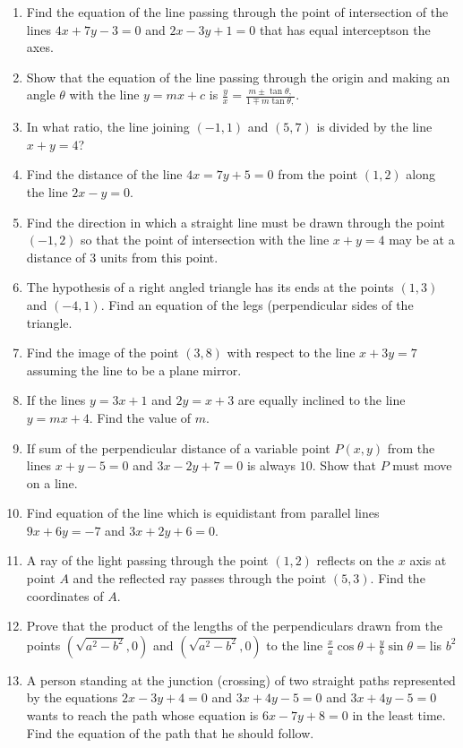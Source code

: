 \documentclass{article}
\theoremstyle{remark}
\begin{document}
\begin{enumerate}
\item Find the equation of the line passing through the point of intersection of the lines $4x+7y-3=0$ and $2x-3y+1=0$ that has equal interceptson the axes.
\item Show that the equation of the line passing through the origin and making an angle $\theta$ with the line $y=mx+c$ is $\frac{y}{x}=\frac{m \pm \tan \theta,}{1 \mp m\tan \theta,}$.
\item In what ratio, the line joining $(-1,1)$ and $(5,7)$ is divided by the line $x+y=4$?
\item Find the distance of the line $4x=7y+5=0$ from the point $(1,2)$ along the line $2x-y=0$.
\item Find the direction in which a straight line must be  drawn through the point $(-1,2)$ so that the point of intersection with the line $x+y=4$ may be at a distance of $3$ units from this point.
\item The hypothesis of a right angled triangle has its ends at the points $(1,3)$ and $(-4,1)$. Find an equation of the legs (perpendicular sides of the triangle.
\item Find the image of the point $(3,8)$ with respect to the line $x+3y=7$ assuming the line to be a plane mirror.
\item If the lines $y= 3x+1$ and $2y= x+3$ are equally inclined to the line $y= mx+4$. Find the value of $m$.
\item If sum of the perpendicular distance of a variable point $P(x,y)$ from the lines $x+y-5=0$ and $3x-2y+7=0$ is always $10$. Show that $P$ must move on a line.
\item Find equation of the line which is equidistant from parallel lines $9x+6y=-7$ and $3x+2y+6=0$.
\item A ray of the light passing through the point $(1,2)$ reflects on the $x$ axis at point $A$ and the reflected ray passes through the point $(5,3)$. Find the coordinates of $A$.
\item Prove that the product of the lengths of the perpendiculars drawn from the points $(\sqrt{a^2-b^2}, 0)$ and $(\sqrt{a^2-b^2}, 0)$ to the line $\frac{x}{a} \cos \theta + \frac{y}{b} \sin \theta = $lis $b^2$
\item A person standing at the junction (crossing) of two straight paths represented by the equations $2x-3y+4=0$ and $3x+4y-5 = 0$ and $3x+4y-5= 0 $ wants to reach the path whose equation is $6x-7y+8=0$ in the least time. Find the equation of the path that he should follow.
\end{enumerate}
\end{document}
